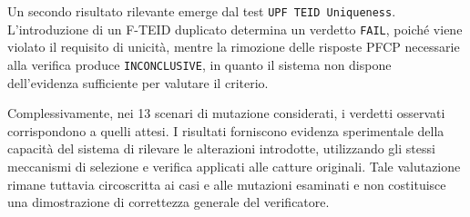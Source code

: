 Un secondo risultato rilevante emerge dal test \texttt{UPF\ TEID\ Uniqueness}. L'introduzione di un F-TEID duplicato determina un verdetto \texttt{FAIL}, poiché viene violato il requisito di unicità, mentre la rimozione delle risposte PFCP necessarie alla verifica produce \texttt{INCONCLUSIVE}, in quanto il sistema non dispone dell'evidenza sufficiente per valutare il criterio.

Complessivamente, nei 13 scenari di mutazione considerati, i verdetti osservati corrispondono a quelli attesi. I risultati forniscono evidenza sperimentale della capacità del sistema di rilevare le alterazioni introdotte, utilizzando gli stessi meccanismi di selezione e verifica applicati alle catture originali. Tale valutazione rimane tuttavia circoscritta ai casi e alle mutazioni esaminati e non costituisce una dimostrazione di correttezza generale del verificatore.

